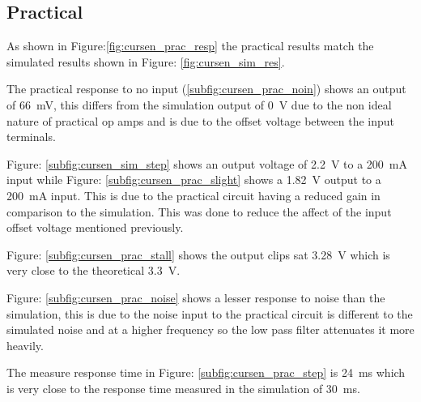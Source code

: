 \newpage

\subsection{Practical}
As shown in Figure:\ref{fig:cursen_prac_resp} the practical results match the simulated results shown in Figure: \ref{fig:cursen_sim_res}. 

The practical response to no input (\ref{subfig:cursen_prac_noin}) shows an output of \SI{66}{\milli\volt}, this differs from the simulation output of \SI{0}{\volt} due to the non ideal nature of practical op amps and is due to the offset voltage between the input terminals.

Figure: \ref{subfig:cursen_sim_step} shows an output voltage of \SI{2.2}{\volt} to a \SI{200}{\milli\ampere} input while Figure: \ref{subfig:cursen_prac_slight} shows a \SI{1.82}{\volt} output to a  \SI{200}{\milli\ampere} input. This is due to the practical circuit having a reduced gain in comparison to the simulation. This was done to reduce the affect of the input offset voltage mentioned previously. 

Figure: \ref{subfig:cursen_prac_stall} shows the output clips sat \SI{3.28}{\volt} which is very close to the theoretical \SI{3.3}{\volt}. 

Figure: \ref{subfig:cursen_prac_noise} shows a lesser response to noise than the simulation, this is due to the noise input to the practical circuit is different to the simulated noise and at a higher frequency so the low pass filter attenuates it more heavily.

The measure response time in Figure: \ref{subfig:cursen_prac_step} is \SI{24}{\milli\second} which is very close to the response time measured in the simulation of \SI{30}{\milli\second}.


